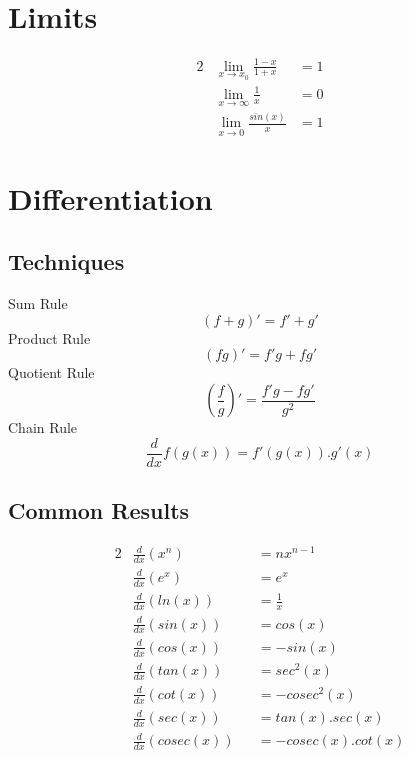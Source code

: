 \documentclass[11pt,a4paper]{article}
\begin{document}
\section{Limits}
\begin{alignat*}{2}
  &\lim_{x \to x_0} \frac{1-x}{1+x} &= 1 \\
  &\lim_{x \to \infty} \frac{1}{x} &= 0 \\
  &\lim_{x \to 0} \frac{sin(x)}{x} &= 1
\end{alignat*}

\section{Differentiation}
\subsection{Techniques}
Sum Rule
$$(f+g)' = f' + g'$$
%
Product Rule
$$(fg)' = f'g + fg'$$
%
Quotient Rule
$$\left(\frac{f}{g}\right)' = \frac{f'g - fg'}{g^2}$$
%
Chain Rule
$$\frac{d}{dx} f(g(x)) = f'(g(x)).g'(x)$$

\subsection{Common Results}
\begin{alignat*}{2}
  &\frac{d}{dx}(x^n) &&= nx^{n-1} \\
  &\frac{d}{dx}(e^x) &&= e^x \\
  &\frac{d}{dx}(ln(x)) &&= \frac{1}{x}\\
  &\frac{d}{dx}(sin(x)) &&= cos(x) \\
  &\frac{d}{dx}(cos(x)) &&= -sin(x) \\
  &\frac{d}{dx}(tan(x)) &&= sec^2(x) \\
  &\frac{d}{dx}(cot(x)) &&= -cosec^2(x) \\
  &\frac{d}{dx}(sec(x)) &&= tan(x).sec(x) \\
  &\frac{d}{dx}(cosec(x)) &&= -cosec(x).cot(x) \\
\end{alignat*}
\end{document}
